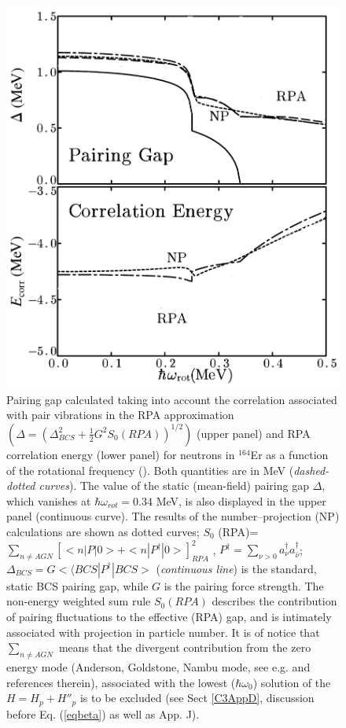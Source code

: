   \begin{figure}
  \centerline{\includegraphics*[width=\textwidth,angle=0]{nutshell/figs/fig1_1_2.pdf}}
  \caption{Pairing gap calculated taking into account the correlation associated with pair vibrations in the RPA approximation $(\Delta=(\Delta^2_{BCS}+\tfrac{1}{2}G^2S_0(RPA))^{1/2})$ (upper panel) and RPA correlation energy (lower panel) for neutrons in $^{164}$Er as a function of the rotational frequency (\cite{Shimizu:89,Shimizu:13}). Both quantities are in MeV (\textit{dashed-dotted curves}). The value of the static (mean-field) pairing gap $\Delta$, which vanishes at $\hbar \omega_{rot}=0.34 $ MeV, is also displayed in the upper panel (continuous curve). The results of the number--projection (NP) calculations are shown as dotted curves;  $S_0$ (RPA)= $\sum_{n \neq AGN} \left[<n|P |0>  + <n|P^{\dagger} |0>\right]^2_{RPA}$ , $P^\dagger=\sum_{\nu>0}a^\dagger_\nu a^\dagger_{\bar \nu}$; \mbox{$\Delta_{BCS} = G<⟨BCS|P^{\dagger}|BCS>$} (\textit{continuous line}) is the standard, static BCS pairing gap,
    while $G$ is the pairing force strength. The non-energy weighted sum rule $S_0 (RPA)$
    describes the contribution of pairing fluctuations to the effective (RPA) gap,
    and is intimately associated with projection in particle number. It is of notice
    that $\sum_{n \neq AGN}$ means that the divergent contribution from the zero energy mode
    (Anderson, Goldstone, Nambu mode, see e.g. \cite{Broglia:00} and references therein), associated with the lowest ($\hbar \omega_0$) solution
    of the $H=H_{p}+H''_p$ is to be excluded (see Sect \ref{C3AppD}, discussion before Eq. (\ref{eqbeta}) as well as \cite{Brink:05} App. J).}\label{fig1.2}
  \end{figure}
  
